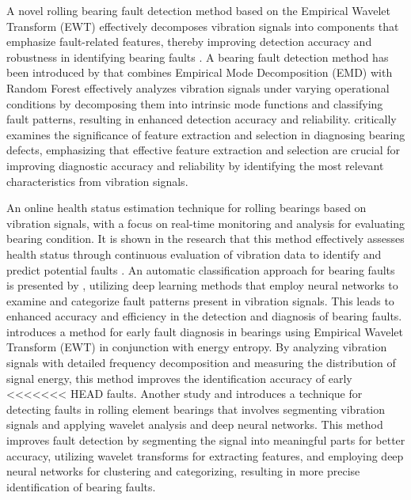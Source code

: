 \documentclass[sn-basic,pdflatex]{sn-jnl}
\theoremstyle{remark}
\theoremstyle{definition}
\begin{document}
A novel rolling bearing fault detection method based on the Empirical
Wavelet Transform (EWT) effectively decomposes vibration signals into
components that emphasize fault-related features, thereby improving
detection accuracy and robustness in identifying bearing faults
\citep{WOS:000467079500501}. A bearing fault detection method has been
introduced by \citet{WOS:000459864800144} that combines Empirical Mode
Decomposition (EMD) with Random Forest effectively analyzes vibration
signals under varying operational conditions by decomposing them into
intrinsic mode functions and classifying fault patterns, resulting in
enhanced detection accuracy and reliability. \citet{WOS:000458657500187}
critically examines the significance of feature extraction and selection
in diagnosing bearing defects, emphasizing that effective feature
extraction and selection are crucial for improving diagnostic accuracy
and reliability by identifying the most relevant characteristics from
vibration signals.

An online health status estimation technique for rolling bearings based
on vibration signals, with a focus on real-time monitoring and analysis
for evaluating bearing condition. It is shown in the research that this
method effectively assesses health status through continuous evaluation
of vibration data to identify and predict potential faults
\citep{WOS:000452922000015}. An automatic classification approach for
bearing faults is presented by \citet{WOS:000453413600001}, utilizing
deep learning methods that employ neural networks to examine and
categorize fault patterns present in vibration signals. This leads to
enhanced accuracy and efficiency in the detection and diagnosis of
bearing faults. \citet{WOS:000452819600235} introduces a method for
early fault diagnosis in bearings using Empirical Wavelet Transform
(EWT) in conjunction with energy entropy. By analyzing vibration signals
with detailed frequency decomposition and measuring the distribution of
signal energy, this method improves the identification accuracy of early
<<<<<<< HEAD
faults. Another study \citet{WOS:000450745100001} and
\citet{WOS:000449334500118} introduces a technique for detecting faults
in rolling element bearings that involves segmenting vibration signals
and applying wavelet analysis and deep neural networks. This method
improves fault detection by segmenting the signal into meaningful parts
for better accuracy, utilizing wavelet transforms for extracting
features, and employing deep neural networks for clustering and
categorizing, resulting in more precise identification of bearing
faults.
\end{document}
